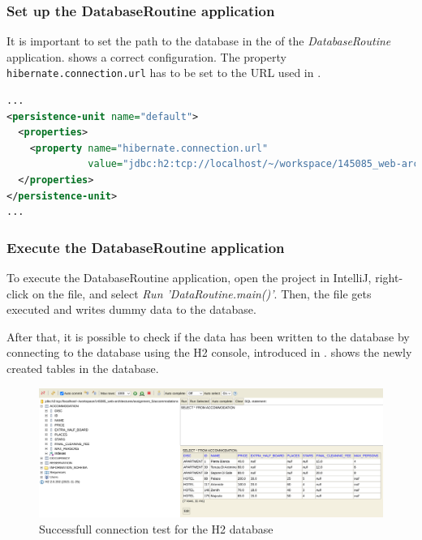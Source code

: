 \subsubsection{Set up the DatabaseRoutine application}\label{sec:03_depl_seeddb_setup}
It is important to set the path to the database in the  of the \textit{DatabaseRoutine} application.  shows a correct configuration. The property \texttt{hibernate.connection.url} has to be set to the URL used in .
\begin{lstlisting}[label=lst:03_depl_seeddb_setup_config, caption=Default data source configuration, language=xml]
...
<persistence-unit name="default">
  <properties>
    <property name="hibernate.connection.url"
              value="jdbc:h2:tcp://localhost/~/workspace/145085_web-architectures/assignment_5/accommodations"/>
  </properties>
</persistence-unit>
...
\end{lstlisting}

\subsubsection{Execute the DatabaseRoutine application}\label{sec:03_depl_seeddb_executeroutine}
To execute the DatabaseRoutine application, open the project in IntelliJ, right-click on the  file, and select \textit{Run 'DataRoutine.main()'}. Then, the file gets executed and writes dummy data to the database.

After that, it is possible to check if the data has been written to the database by connecting to the database using the H2 console, introduced in .  shows the newly created tables in the database.
\begin{figure}[h]
\centering
\includegraphics[scale=0.15]{images/03_depl/dummy-data}
\caption{Successfull connection test for the H2 database}
\label{fig:03_depl_seeddb_executeroutine_data}
\end{figure}


